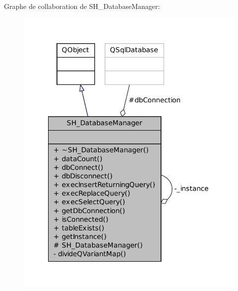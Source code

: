 Graphe de collaboration de S\-H\-\_\-\-Database\-Manager\-:\nopagebreak
\begin{figure}[H]
\begin{center}
\leavevmode
\includegraphics[width=340pt]{classSH__DatabaseManager__coll__graph}
\end{center}
\end{figure}
